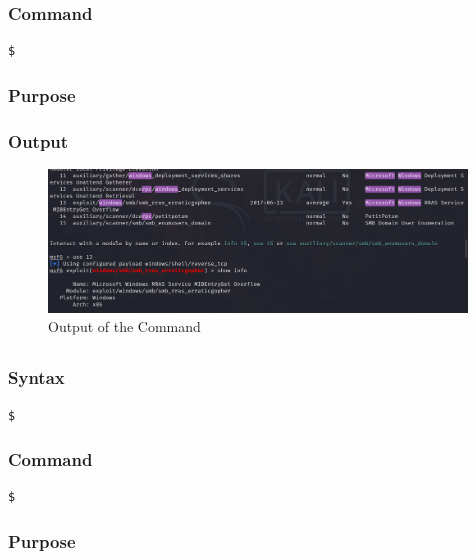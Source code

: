 \documentclass[11pt]{article}
\begin{document}
\subsubsection*{Command}
\begin{verbatim}
$
\end{verbatim}

\subsubsection*{Purpose}

\subsubsection*{Output}
\begin{figure}[H]
    \centering
    \includegraphics[width=0.99\textwidth]{a3_ss (20).png}
    \caption{Output of the Command}
\end{figure}
\subsection{}

\subsubsection*{Syntax}
\begin{verbatim}
$
\end{verbatim}

\subsubsection*{Command}
\begin{verbatim}
$
\end{verbatim}

\subsubsection*{Purpose}
\end{document}
